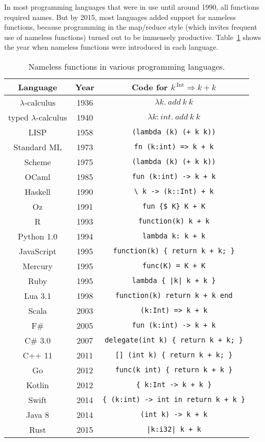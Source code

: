 In most programming languages that were in use until around 1990,
all functions required names. But by 2015, most languages added support
for nameless functions, because programming in the map/reduce style
(which invites frequent use of nameless functions) turned out to be
immensely productive. Table\ \ref{lambda-functions-table} shows
the year when nameless functions were introduced in each language.

\begin{table}
\begin{centering}
\begin{tabular}{|c|c|c|}
\hline 
\textbf{Language } & \textbf{Year} & \textbf{Code for }$k^{:\text{Int}}\Rightarrow k+k$\tabularnewline
\hline 
\hline 
$\lambda$-calculus & 1936 & $\lambda k.~add~k~k$\tabularnewline
\hline 
typed $\lambda$-calculus & 1940 & $\lambda k:int.~add~k~k$\tabularnewline
\hline 
LISP & 1958 & \texttt{\footnotesize{}(lambda (k) (+ k k))}\tabularnewline
\hline 
Standard ML & 1973 & \texttt{\footnotesize{}fn (k:int) => k + k}\tabularnewline
\hline 
Scheme & 1975 & \texttt{\footnotesize{}(lambda (k) (+ k k))}\tabularnewline
\hline 
OCaml & 1985 & \texttt{\footnotesize{}fun (k:int) -> k + k}\tabularnewline
\hline 
Haskell  & 1990 & \texttt{\footnotesize{}\textbackslash{} k -> (k::Int) + k}\tabularnewline
\hline 
Oz & 1991 & \texttt{\footnotesize{}fun \{\$ K\} K + K}\tabularnewline
\hline 
R  & 1993 & \texttt{\footnotesize{}function(k) k + k}\tabularnewline
\hline 
Python 1.0 & 1994 & \texttt{\footnotesize{}lambda k: k + k}\tabularnewline
\hline 
JavaScript  & 1995 & \texttt{\footnotesize{}function(k) \{ return k + k; \}}\tabularnewline
\hline 
Mercury  & 1995 & \texttt{\footnotesize{}func(K) = K + K}\tabularnewline
\hline 
Ruby  & 1995 & \texttt{\footnotesize{}lambda \{ |k| k + k \}}\tabularnewline
\hline 
Lua 3.1 & 1998 & \texttt{\footnotesize{}function(k) return k + k end}\tabularnewline
\hline 
Scala  & 2003 & \texttt{\footnotesize{}(k:Int) => k + k}\tabularnewline
\hline 
F\# & 2005 & \texttt{\footnotesize{}fun (k:int) -> k + k}\tabularnewline
\hline 
C\# 3.0 & 2007 & \texttt{\footnotesize{}delegate(int k) \{ return k + k; \}}\tabularnewline
\hline 
C++ 11 & 2011 & \texttt{\footnotesize{}{[}{]} (int k) \{ return k + k; \}}\tabularnewline
\hline 
Go & 2012 & \texttt{\footnotesize{}func(k int) \{ return k + k \}}\tabularnewline
\hline 
Kotlin & 2012 & \texttt{\footnotesize{}\{ k:Int -> k + k \}}\tabularnewline
\hline 
Swift  & 2014 & \texttt{\footnotesize{}\{ (k:int) -> int in return k + k \}}\tabularnewline
\hline 
Java 8 & 2014 & \texttt{\footnotesize{}(int k) -> k + k}\tabularnewline
\hline 
Rust & 2015 & \texttt{\footnotesize{}|k:i32| k + k}\tabularnewline
\hline 
\end{tabular}
\par\end{centering}
\caption{Nameless functions in various programming languages.}
\label{lambda-functions-table}
\end{table}

